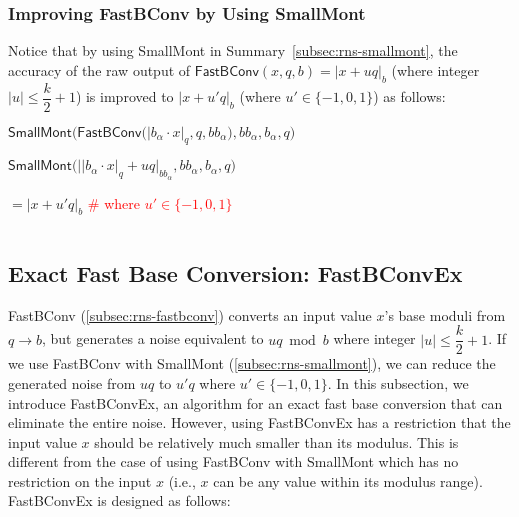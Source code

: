 \subsubsection{Improving \textsf{FastBConv} by Using \textsf{SmallMont}}
\label{subsubsec:rns-smallmont-fastbconv}

Notice that by using \textsf{SmallMont} in Summary~\ref*{subsec:rns-smallmont}, the accuracy of the raw output of $\textsf{FastBConv}(x, q, b) = |x + uq|_b$ (where integer $|u| \leq \dfrac{k}{2}+1$) is improved to $|x + u'q|_b$ (where $u' \in \{-1, 0, 1\}$) as follows:

$\textsf{SmallMont}\bm(\textsf{FastBConv}\bm(|b_\alpha \cdot x|_q, q, bb_\alpha\bm), bb_\alpha, b_\alpha, q\bm) $

$\textsf{SmallMont}\bm(\Big||b_\alpha \cdot x|_q + uq\Big|_{bb_\alpha}, bb_\alpha, b_\alpha, q\bm) $


$= |x + u'q|_b$ \textcolor{red}{ \# where $u' \in \{-1, 0, 1\}$}

$ $



\subsection{Exact Fast Base Conversion: \textsf{FastBConvEx}}
\label{subsec:rns-fastbconvex}

\textsf{FastBConv} (\autoref{subsec:rns-fastbconv}) converts an input value $x$'s base moduli from $q \rightarrow b$, but generates a noise equivalent to $uq \bmod b$ where integer $|u| \leq \dfrac{k}{2}+1$. If we use \textsf{FastBConv} with \textsf{SmallMont} (\autoref{subsec:rns-smallmont}), we can reduce the generated noise from $uq$ to $u'q$ where $u' \in \{-1, 0, 1\}$. In this subsection, we introduce \textsf{FastBConvEx}, an algorithm for an exact fast base conversion that can eliminate the entire noise. However, using \textsf{FastBConvEx} has a restriction that the input value $x$ should be relatively much smaller than its modulus. This is different from the case of using \textsf{FastBConv} with \textsf{SmallMont} which has no restriction on the input $x$ (i.e., $x$ can be any value within its modulus range). \textsf{FastBConvEx} is designed as follows:

